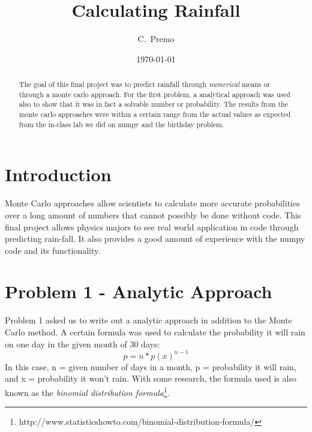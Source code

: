 \documentclass[twocolumn]{revtex4}
\begin{document}
\title{
Calculating Rainfall
}

\author{C.~Premo}

\date{\today}

\begin{abstract}
The goal of this final project was to predict rainfall through \textit{numerical} means or through a monte carlo approach. For the first problem, a analytical approach was used also to show that it was in fact a solvable number or probability. The results from the monte carlo approaches were within a certain range from the actual values as expected from the in-class lab we did on numpy and the birthday problem.
\end{abstract}

\maketitle
\section{Introduction}
Monte Carlo approaches allow scientists to calculate more accurate probabilities over a long amount of numbers that cannot possibly be done without code. This final project allows physics majors to see real world application in code through predicting rain-fall. It also provides a good amount of experience with the numpy code and its functionality. 

\section{Problem 1 - Analytic Approach}

Problem 1 asked us to write out a analytic approach in addition to the Monte Carlo method. A certain formula was used to calculate the probability it will rain on one day in the given month of 30 days: \begin{equation} \label{bi_di} p = n * p(x)^{n-1} \end{equation} In this case, n = given number of days in a month, p = probability it will rain, and x = probability it won't rain. With some research, the formula used is also known as the \textit{binomial distribution formula}\footnote{http://www.statisticshowto.com/binomial-distribution-formula/}.
\end{document}
